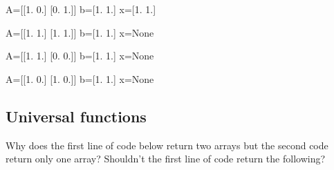 \documentclass[letterpaper,10pt,english]{sphinxmanual}
\begin{document}
\begin{sphinxVerbatim}[commandchars=\\\{\}]
   
\end{sphinxVerbatim}

\begin{sphinxVerbatim}[commandchars=\\\{\}]
A=[[1. 0.]
 [0. 1.]]
b=[1. 1.]
x=[1. 1.]

A=[[1. 1.]
 [1. 1.]]
b=[1. 1.]
x=None

A=[[1. 1.]
 [0. 0.]]
b=[1. 1.]
x=None

A=[[1. 0.]
 [1. 0.]]
b=[1. 1.]
x=None
\end{sphinxVerbatim}


\subsection{Universal functions}
\label{\detokenize{Lecture9/Monte Carlo Simulation and Linear Algebra:universal-functions}}
Why does the first line of code below return two arrays but the second code return only one array? Shouldn’t the first line of code return the following?

\begin{sphinxVerbatim}[commandchars=\\\{\}]
\PYG{p}{[}\PYG{p}{[}  \PYG{p}{]}
       \PYG{p}{[}  \PYG{p}{]}\PYG{p}{]}
\end{sphinxVerbatim}
\end{document}

